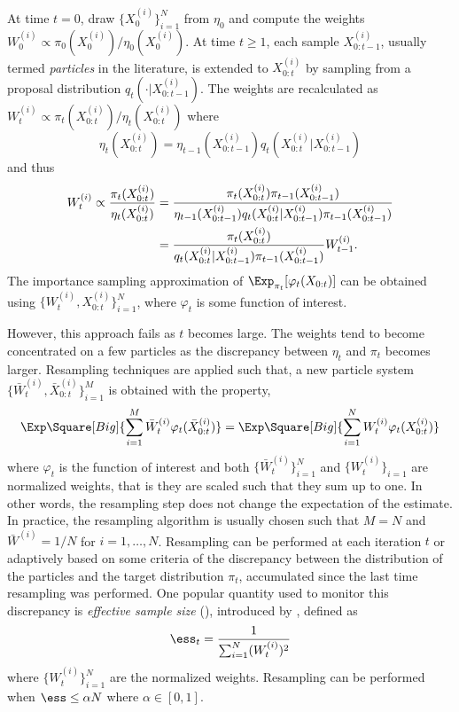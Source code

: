 At time $t = 0$, draw $\{X_0^{(i)}\}_{i=1}^N$ from $\eta_0$ and compute the weights $W_0^{(i)} \propto \pi_0(X_0^{(i)})/\eta_0(X_0^{(i)})$. At time $t\ge1$, each sample $X_{0:t-1}^{(i)}$, usually termed \emph{particles} in the literature, is extended to $X_{0:t}^{(i)}$ by sampling from a proposal distribution $q_t(\cdot|X_{0:t-1}^{(i)})$. The weights are recalculated as $W_t^{(i)} \propto \pi_t(X_{0:t}^{(i)})/\eta_t(X_{0:t}^{(i)})$ where
\begin{equation}
  \eta_t(X_{0:t}^{(i)}) =
  \eta_{t-1}(X_{0:t-1}^{(i)})q_t(X_{0:t}^{(i)}|X_{0:t-1}^{(i)})
\end{equation}
and thus
\begin{align}
  W_t^{(i)} \propto \frac{\pi_t(X_{0:t}^{(i)})}{\eta_t(X_{0:t}^{(i)})}
  &= \frac{\pi_t(X_{0:t}^{(i)})\pi_{t-1}(X_{0:t-1}^{(i)})}
  {\eta_{t-1}(X_{0:t-1}^{(i)})q_t(X_{0:t}^{(i)}|X_{0:t-1}^{(i)})
    \pi_{t-1}(X_{0:t-1}^{(i)})} \notag\\
  &= \frac{\pi_t(X_{0:t}^{(i)})}
  {q_t(X_{0:t}^{(i)}|X_{0:t-1}^{(i)})\pi_{t-1}(X_{0:t-1}^{(i)})}W_{t-1}^{(i)}.
  \label{eq:si}
\end{align}
The importance sampling approximation of $\Exp_{\pi_t}[\varphi_t(X_{0:t})]$ can be obtained using $\{W_t^{(i)},X_{0:t}^{(i)}\}_{i=1}^N$, where $\varphi_t$ is some function of interest.

However, this approach fails as $t$ becomes large. The weights tend to become concentrated on a few particles as the discrepancy between $\eta_t$ and $\pi_t$ becomes larger. Resampling techniques are applied such that, a new particle system $\{\bar{W}_t^{(i)},\bar{X}_{0:t}^{(i)}\}_{i=1}^M$ is obtained with the property,
\begin{equation}
  \Exp\Square[Big]{\sum_{i=1}^M\bar{W}_t^{(i)}\varphi_t(\bar{X}_{0:t}^{(i)})}
  = \Exp\Square[Big]{\sum_{i=1}^NW_t^{(i)}\varphi_t(X_{0:t}^{(i)})}
  \label{eq:resample}
\end{equation}
where $\varphi_t$ is the function of interest and both $\{\bar{W}_t^{(i)}\}_{i=1}^N$ and $\{W_t^{(i)}\}_{i=1}$ are normalized weights, that is they are scaled such that they sum up to one. In other words, the resampling step does not change the expectation of the estimate. In practice, the resampling algorithm is usually chosen such that $M = N$ and $\bar{W}^{(i)} = 1/N$ for $i=1,\dots,N$. Resampling can be performed at each iteration $t$ or adaptively based on some criteria of the discrepancy between the distribution of the particles and the target distribution $\pi_t$, accumulated since the last time resampling was performed. One popular quantity used to monitor this discrepancy is \emph{effective sample size} (\ess), introduced by \cite{Liu:1998iu}, defined as
\begin{equation}
  \ess_t = \frac{1}{\sum_{i=1}^N (W_t^{(i)})^2}
\end{equation}
where $\{W_t^{(i)}\}_{i=1}^N$ are the normalized weights. Resampling can be performed when $\ess\le \alpha N$ where $\alpha\in[0,1]$.


